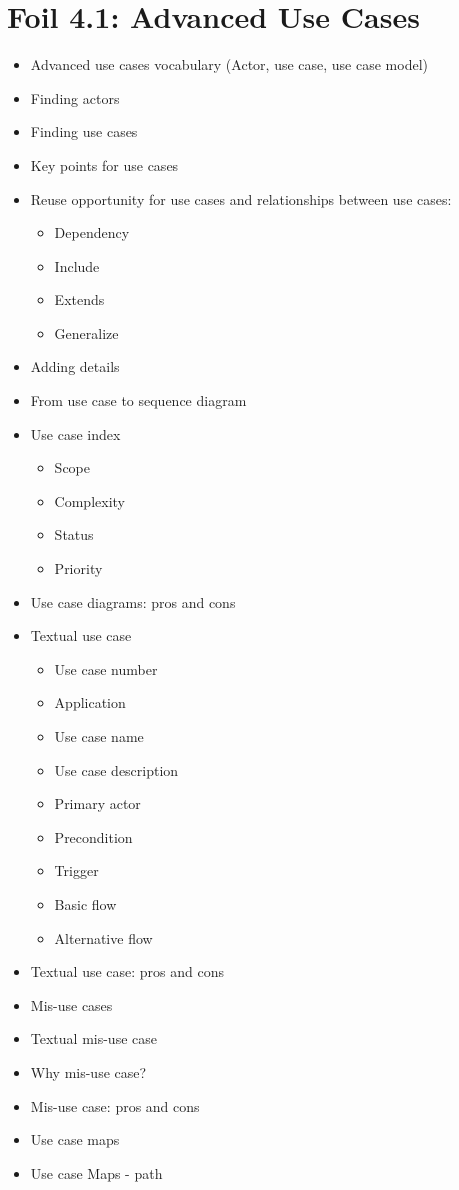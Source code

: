 	\section{Foil 4.1: Advanced Use Cases}
		\begin{itemize}
			\item Advanced use cases vocabulary (Actor, use case, use case model)
			\item Finding actors
			\item Finding use cases
			\item Key points for use cases
			\item Reuse opportunity for use cases and relationships between use cases:
				\begin{itemize}
					\item Dependency
					\item Include
					\item Extends
					\item Generalize
				\end{itemize}
			\item Adding details
			\item From use case to sequence diagram
			\item Use case index
				\begin{itemize}
					\item Scope
					\item Complexity
					\item Status
					\item Priority
				\end{itemize}
			\item Use case diagrams: pros and cons
			\item Textual use case
				\begin{itemize}
					\item Use case number
					\item Application
					\item Use case name
					\item Use case description
					\item Primary actor
					\item Precondition
					\item Trigger
					\item Basic flow
					\item Alternative flow
				\end{itemize}
			\item Textual use case: pros and cons
			\item Mis-use cases
			\item Textual mis-use case
			\item Why mis-use case?
			\item Mis-use case: pros and cons
			\item Use case maps
			\item Use case Maps - path
		\end{itemize}


